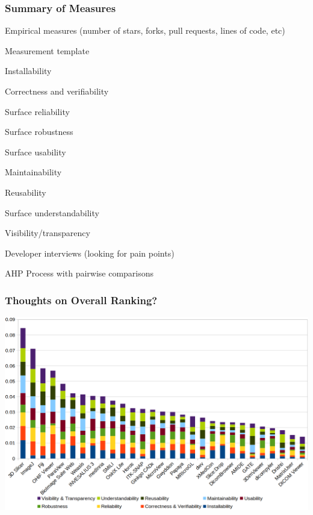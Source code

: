 \documentclass[t,12pt,numbers,fleqn]{beamer}
\begin{document}

\begin{frame}
\frametitle{Summary of Measures}

\bi
\item Empirical measures (number of stars, forks, pull requests, lines of code, etc)
\item Measurement template
\bi
\item Installability
\item Correctness and verifiability
\item Surface reliability
\item Surface robustness
\item Surface usability
\item Maintainability
\item Reusability
\item Surface understandability
\item Visibility/transparency
\ei
\item Developer interviews (looking for pain points)
\item AHP Process with pairwise comparisons
  \ei
\end{frame}


\begin{frame}
\frametitle{Thoughts on Overall Ranking?}

\bigskip

    \includegraphics[width=1.0\textwidth]{overall_scores.png}

\end{frame}
\end{document}
